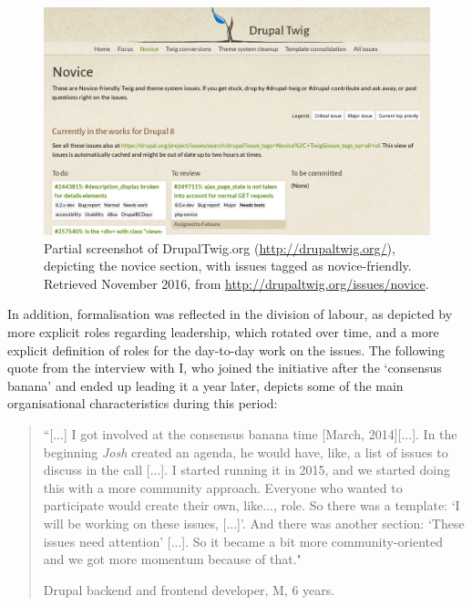 \begin{figure}[H]
\centering
\includegraphics[scale=0.3]{img/online/drupaltwig.png}
\caption[Screenshot of DrupalTwig.org]%
{Partial screenshot of DrupalTwig.org (\url{http://drupaltwig.org/}), depicting the novice section, with issues tagged as novice-friendly. Retrieved  November 2016, from \url{http://drupaltwig.org/issues/novice}.}
\label{drupaltwig}
\end{figure}

In addition, formalisation was reflected in the division of labour, as depicted by more explicit roles regarding leadership, which rotated over time, and a more explicit definition of roles for the day-to-day work on the issues. The following quote from the interview with I, who joined the initiative after the `consensus banana' and ended up leading it a year later, depicts some of the main organisational characteristics during this period:

\begin{quotation}
``[...] I got involved at the consensus banana time [March, 2014][...]. In the beginning \textit{Josh} created an agenda, he would have, like, a list of issues to discuss in the call [...]. I started running it in 2015, and we started doing this with a more community approach. Everyone who wanted to participate would create their own, like..., role. So there was a template: `I will be working on these issues, [...]'. And there was another section: `These issues need attention' [...]. So it became a bit more community-oriented and we got more momentum because of that."

\begin{flushright}\footnotesize{Drupal backend and frontend developer, M, 6 years.}\end{flushright}
\end{quotation}

